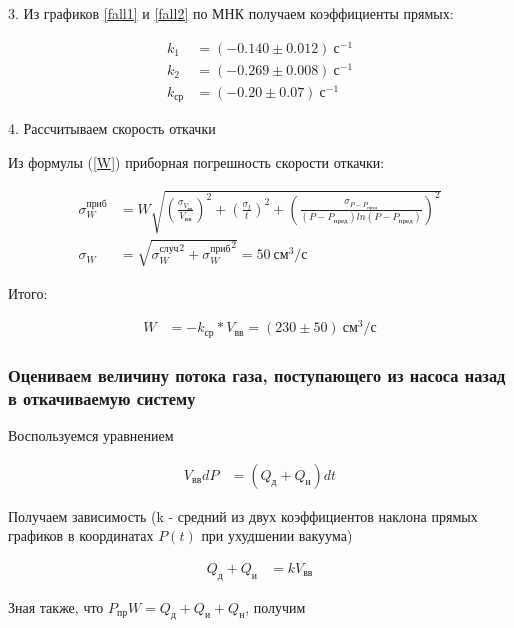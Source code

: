 \documentclass[a4paper, 12pt]{article}
\begin{document}
            3. Из графиков \ref{fall1} и \ref{fall2} по МНК получаем коэффициенты прямых:

            \begin{align*}
                k_1 &= (-0.140 \pm 0.012)~с^{-1}\\
                k_2 &= (-0.269 \pm 0.008)~с^{-1}\\
                k_{ср} &= (-0.20 \pm 0.07)~с^{-1}
            \end{align*}

            4. Рассчитываем скорость откачки

            Из формулы (\ref{W}) приборная погрешность скорости откачки:

            \begin{align*}
                \sigma_W^{приб} &= W \sqrt{\left( \frac{\sigma_{V_{вв}}}{V_{вв}} \right)^2 + \left( \frac{\sigma_{t}}{t} \right)^2 + \left( \frac{\sigma_{P - P_{пред}}}{(P - P_{пред}) ln(P - P_{пред})} \right)^2}\\
                \sigma_W &= \sqrt{{\sigma_W^{случ}}^2 + {\sigma_W^{приб}}^2} = 50~см^3/с
            \end{align*}

            Итого:

            \begin{align*}
                W &= -k_{ср} * V_{вв} = (230 \pm 50)~см^3/с
            \end{align*}

        \subsubsection{Оцениваем величину потока газа, поступающего из насоса назад в откачиваемую систему}

            Воспользуемся уравнением

            \begin{align*}
                V_{вв} dP &= (Q_д + Q_и)dt
            \end{align*}

            Получаем зависимость (k - средний из двух коэффициентов наклона прямых графиков в координатах $P(t)$ при ухудшении вакуума)

            \begin{align*}
                Q_д + Q_и &= k V_{вв}
            \end{align*}

            Зная также, что $P_{пр}W = Q_д + Q_и + Q_н$, получим
\end{document}
